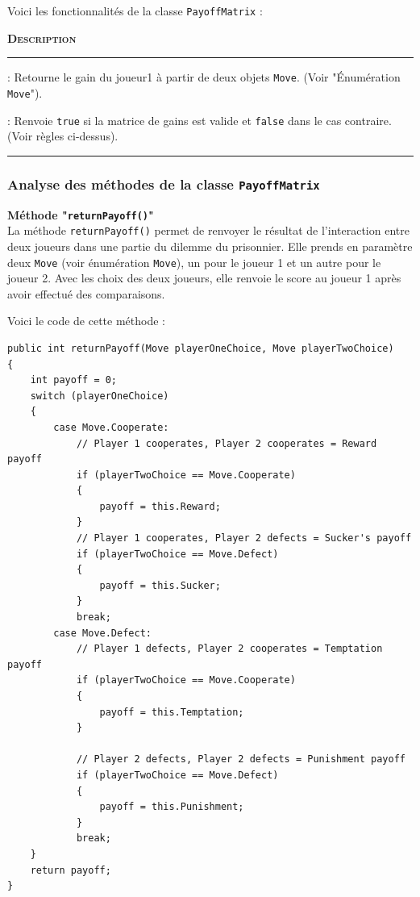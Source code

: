 \documentclass[a4paper]{article}
\begin{document}
Voici les fonctionnalités de la classe \texttt{PayoffMatrix} :

\vspace{0.25cm}
\begin{description}
    \small
    \item[\textbf{\textsc{Méthode}}] \hspace{30pt}\textbf{\textsc{Description}}
    \vspace{0.1cm}
    \hrule{}
    \item[\texttt{returnPayoff()}] : Retourne le gain du joueur1 à partir de deux objets \texttt{Move}. (Voir "Énumération \texttt{Move}").
    \item[\texttt{isValid()}] :  Renvoie \texttt{true} si la matrice de gains est valide et \texttt{false} dans le cas contraire. (Voir règles ci-dessus).
\end{description}
\vspace{0.25cm}
\hrule{}
\vspace{0.5cm}
\pagebreak

\subsubsection{Analyse des méthodes de la classe \texttt{PayoffMatrix}}
\textbf{Méthode "\texttt{returnPayoff()}"}\\
La méthode \texttt{returnPayoff()} permet de renvoyer le résultat de l'interaction entre deux joueurs dans une partie du dilemme du prisonnier. Elle prends en paramètre deux \texttt{Move} (voir énumération \texttt{Move}), un pour le joueur 1 et un autre pour le joueur 2. Avec les choix des deux joueurs, elle renvoie le score au joueur 1 après avoir effectué des comparaisons.

Voici le code de cette méthode :
\begin{lstlisting}
public int returnPayoff(Move playerOneChoice, Move playerTwoChoice)
{
    int payoff = 0;
    switch (playerOneChoice)
    {
        case Move.Cooperate:
            // Player 1 cooperates, Player 2 cooperates = Reward payoff
            if (playerTwoChoice == Move.Cooperate)
            {
                payoff = this.Reward;
            }
            // Player 1 cooperates, Player 2 defects = Sucker's payoff
            if (playerTwoChoice == Move.Defect)
            {
                payoff = this.Sucker;
            }
            break;
        case Move.Defect:
            // Player 1 defects, Player 2 cooperates = Temptation payoff
            if (playerTwoChoice == Move.Cooperate)
            {
                payoff = this.Temptation;
            }

            // Player 2 defects, Player 2 defects = Punishment payoff
            if (playerTwoChoice == Move.Defect)
            {
                payoff = this.Punishment;
            }
            break;
    }
    return payoff;
}
\end{lstlisting}
\end{document}
